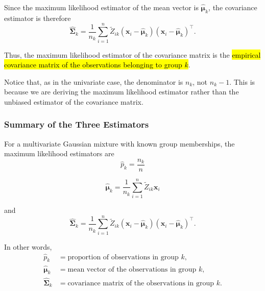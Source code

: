 Since the maximum likelihood estimator of the mean vector is
$\hat{\boldsymbol{\mu}}_k$, the covariance estimator is therefore
\begin{equation*}
\boxed{
\hat{\boldsymbol{\Sigma}}_k
=
\frac{1}{n_k}
\sum_{i=1}^n
\tilde{Z}_{ik}
(\boldsymbol{x}_i-\hat{\boldsymbol{\mu}}_k)
(\boldsymbol{x}_i-\hat{\boldsymbol{\mu}}_k)^\top
}.
\end{equation*}

Thus, the maximum likelihood estimator of the covariance matrix is
the \hl{empirical covariance matrix of the observations belonging
to group $k$}.

Notice that, as in the univariate case, the denominator is $n_k$,
not $n_k-1$. This is because we are deriving the maximum likelihood
estimator rather than the unbiased estimator of the covariance
matrix.


\subsubsection*{Summary of the Three Estimators}

For a multivariate Gaussian mixture with known group memberships,
the maximum likelihood estimators are
\begin{equation*}
\boxed{
\hat{p}_k
=
\frac{n_k}{n}
}
\end{equation*}

\begin{equation*}
\boxed{
\hat{\boldsymbol{\mu}}_k
=
\frac{1}{n_k}
\sum_{i=1}^n
\tilde{Z}_{ik}\boldsymbol{x}_i
}
\end{equation*}

and
\begin{equation*}
\boxed{
\hat{\boldsymbol{\Sigma}}_k
=
\frac{1}{n_k}
\sum_{i=1}^n
\tilde{Z}_{ik}
(\boldsymbol{x}_i-\hat{\boldsymbol{\mu}}_k)
(\boldsymbol{x}_i-\hat{\boldsymbol{\mu}}_k)^\top
}.
\end{equation*}

In other words,
\begin{equation*}
\boxed{
\begin{aligned}
\hat{p}_k
&=\text{proportion of observations in group }k,\\[2mm]
\hat{\boldsymbol{\mu}}_k
&=\text{mean vector of the observations in group }k,\\[2mm]
\hat{\boldsymbol{\Sigma}}_k
&=\text{covariance matrix of the observations in group }k.
\end{aligned}
}
\end{equation*}

